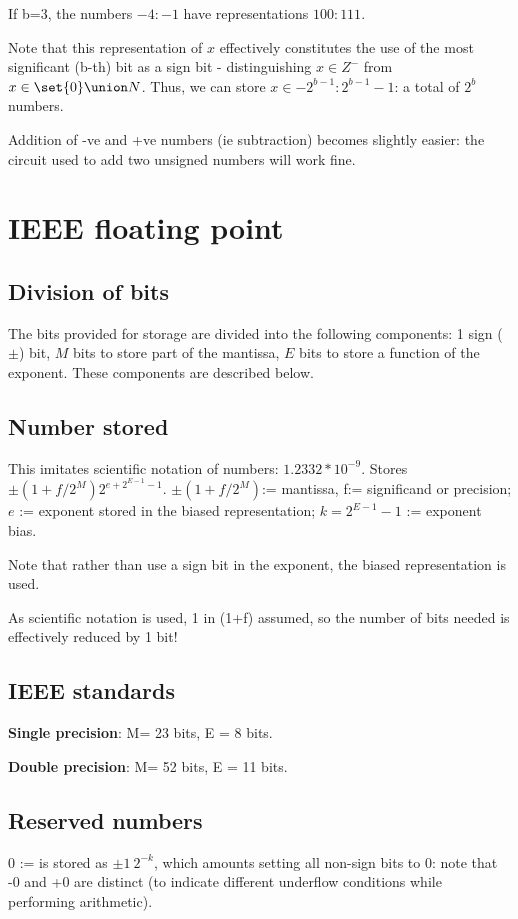 \documentclass[oneside, article]{memoir}
\begin{document}
If b=3, the numbers $-4:-1$ have representations $100:111$.

Note that this representation of $x$ effectively constitutes the use of the most significant (b-th) bit as a sign bit - distinguishing $x \in Z^-$ from $x \in \set{0} \union N$. Thus, we can store $x \in -2^{b-1}:2^{b-1} - 1$: a total of $2^{b}$ numbers.

Addition of -ve and +ve numbers (ie subtraction) becomes slightly easier: the circuit used to add two unsigned numbers will work fine.

\section{IEEE floating point}
\subsection{Division of bits}
The bits provided for storage are divided into the following components: 1 sign ($\pm$) bit, $M$ bits to store part of the mantissa, $E$ bits to store a function of the exponent. These components are described below.

\subsection{Number stored}
This imitates scientific notation of numbers: $1.2332 * 10^{-9}$. Stores $\pm (1+f/2^{M})2^{e + 2^{E-1} - 1}$. $\pm (1+f/2^{M})$:= mantissa, f:= significand or precision; $e$ := exponent stored in the biased representation; $k = 2^{E-1} - 1$ := exponent bias. 

Note that rather than use a sign bit in the exponent, the biased representation is used.

As scientific notation is used, 1 in (1+f) assumed, so the number of bits needed is effectively reduced by 1 bit!

\subsection{IEEE standards}
\textbf{Single precision}: M= 23 bits, E = 8 bits.

\textbf{Double precision}: M= 52 bits, E = 11 bits.

\subsection{Reserved numbers}
0 := is stored as $\pm 1\ 2^{-k}$, which amounts setting all non-sign bits to 0: note that -0 and +0 are distinct (to indicate different underflow conditions while performing arithmetic).
\end{document}
